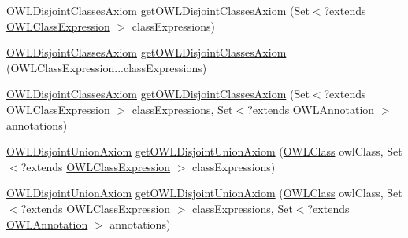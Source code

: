 \begin{DoxyCompactItemize}
\item 
\hyperlink{interfaceorg_1_1semanticweb_1_1owlapi_1_1model_1_1_o_w_l_disjoint_classes_axiom}{O\-W\-L\-Disjoint\-Classes\-Axiom} \hyperlink{interfaceorg_1_1semanticweb_1_1owlapi_1_1model_1_1_o_w_l_data_factory_aebfec1458100827b41545476712e82e5}{get\-O\-W\-L\-Disjoint\-Classes\-Axiom} (Set$<$?extends \hyperlink{interfaceorg_1_1semanticweb_1_1owlapi_1_1model_1_1_o_w_l_class_expression}{O\-W\-L\-Class\-Expression} $>$ class\-Expressions)
\item 
\hyperlink{interfaceorg_1_1semanticweb_1_1owlapi_1_1model_1_1_o_w_l_disjoint_classes_axiom}{O\-W\-L\-Disjoint\-Classes\-Axiom} \hyperlink{interfaceorg_1_1semanticweb_1_1owlapi_1_1model_1_1_o_w_l_data_factory_ac839ff3540b0936a85da8888e9f35881}{get\-O\-W\-L\-Disjoint\-Classes\-Axiom} (O\-W\-L\-Class\-Expression...\-class\-Expressions)
\item 
\hyperlink{interfaceorg_1_1semanticweb_1_1owlapi_1_1model_1_1_o_w_l_disjoint_classes_axiom}{O\-W\-L\-Disjoint\-Classes\-Axiom} \hyperlink{interfaceorg_1_1semanticweb_1_1owlapi_1_1model_1_1_o_w_l_data_factory_a97889d1b16a4b01aa9603e0489b3c192}{get\-O\-W\-L\-Disjoint\-Classes\-Axiom} (Set$<$?extends \hyperlink{interfaceorg_1_1semanticweb_1_1owlapi_1_1model_1_1_o_w_l_class_expression}{O\-W\-L\-Class\-Expression} $>$ class\-Expressions, Set$<$?extends \hyperlink{interfaceorg_1_1semanticweb_1_1owlapi_1_1model_1_1_o_w_l_annotation}{O\-W\-L\-Annotation} $>$ annotations)
\item 
\hyperlink{interfaceorg_1_1semanticweb_1_1owlapi_1_1model_1_1_o_w_l_disjoint_union_axiom}{O\-W\-L\-Disjoint\-Union\-Axiom} \hyperlink{interfaceorg_1_1semanticweb_1_1owlapi_1_1model_1_1_o_w_l_data_factory_ad0c2e3a5d7641741ff10424dc5b3b5ef}{get\-O\-W\-L\-Disjoint\-Union\-Axiom} (\hyperlink{interfaceorg_1_1semanticweb_1_1owlapi_1_1model_1_1_o_w_l_class}{O\-W\-L\-Class} owl\-Class, Set$<$?extends \hyperlink{interfaceorg_1_1semanticweb_1_1owlapi_1_1model_1_1_o_w_l_class_expression}{O\-W\-L\-Class\-Expression} $>$ class\-Expressions)
\item 
\hyperlink{interfaceorg_1_1semanticweb_1_1owlapi_1_1model_1_1_o_w_l_disjoint_union_axiom}{O\-W\-L\-Disjoint\-Union\-Axiom} \hyperlink{interfaceorg_1_1semanticweb_1_1owlapi_1_1model_1_1_o_w_l_data_factory_aea1f9cebe61cb2942712344c37f83a8f}{get\-O\-W\-L\-Disjoint\-Union\-Axiom} (\hyperlink{interfaceorg_1_1semanticweb_1_1owlapi_1_1model_1_1_o_w_l_class}{O\-W\-L\-Class} owl\-Class, Set$<$?extends \hyperlink{interfaceorg_1_1semanticweb_1_1owlapi_1_1model_1_1_o_w_l_class_expression}{O\-W\-L\-Class\-Expression} $>$ class\-Expressions, Set$<$?extends \hyperlink{interfaceorg_1_1semanticweb_1_1owlapi_1_1model_1_1_o_w_l_annotation}{O\-W\-L\-Annotation} $>$ annotations)

\end{DoxyCompactItemize}
